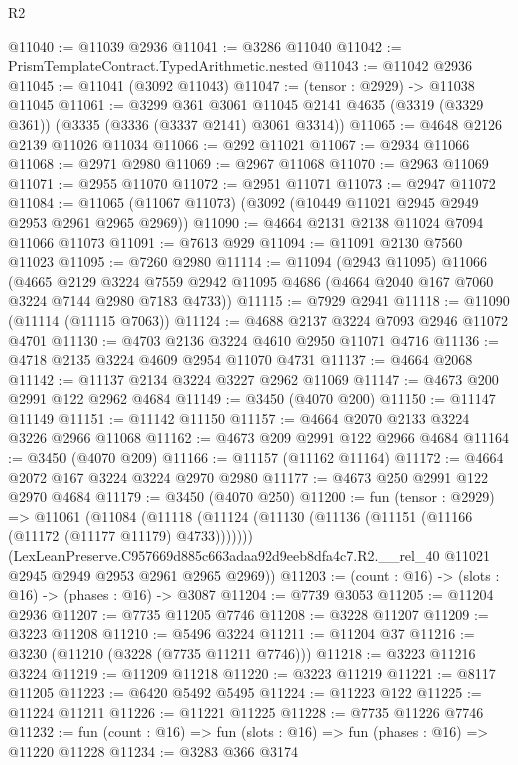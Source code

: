 \begin{lexlean}{R2}
\begin{coremodule}
@11040 := @11039 @2936
@11041 := @3286 @11040
@11042 := PrismTemplateContract.TypedArithmetic.nested
@11043 := @11042 @2936
@11045 := @11041 (@3092 @11043)
@11047 := (tensor : @2929) -> @11038 @11045
@11061 := @3299
    @361
    @3061
    @11045
    @2141
    @4635
    (@3319 (@3329 @361))
    (@3335 (@3336 (@3337 @2141) @3061 @3314))
@11065 := @4648 @2126 @2139 @11026 @11034
@11066 := @292 @11021
@11067 := @2934 @11066
@11068 := @2971 @2980
@11069 := @2967 @11068
@11070 := @2963 @11069
@11071 := @2955 @11070
@11072 := @2951 @11071
@11073 := @2947 @11072
@11084 := @11065 (@11067 @11073) (@3092 (@10449 @11021 @2945 @2949 @2953 @2961 @2965 @2969))
@11090 := @4664 @2131 @2138 @11024 @7094 @11066 @11073
@11091 := @7613 @929
@11094 := @11091 @2130 @7560 @11023
@11095 := @7260 @2980
@11114 := @11094
    (@2943 @11095)
    @11066
    (@4665
      @2129
      @3224
      @7559
      @2942
      @11095
      @4686
      (@4664 @2040 @167 @7060 @3224 @7144 @2980 @7183 @4733))
@11115 := @7929 @2941
@11118 := @11090 (@11114 (@11115 @7063))
@11124 := @4688 @2137 @3224 @7093 @2946 @11072 @4701
@11130 := @4703 @2136 @3224 @4610 @2950 @11071 @4716
@11136 := @4718 @2135 @3224 @4609 @2954 @11070 @4731
@11137 := @4664 @2068
@11142 := @11137 @2134 @3224 @3227 @2962 @11069
@11147 := @4673 @200 @2991 @122 @2962 @4684
@11149 := @3450 (@4070 @200)
@11150 := @11147 @11149
@11151 := @11142 @11150
@11157 := @4664 @2070 @2133 @3224 @3226 @2966 @11068
@11162 := @4673 @209 @2991 @122 @2966 @4684
@11164 := @3450 (@4070 @209)
@11166 := @11157 (@11162 @11164)
@11172 := @4664 @2072 @167 @3224 @3224 @2970 @2980
@11177 := @4673 @250 @2991 @122 @2970 @4684
@11179 := @3450 (@4070 @250)
@11200 := fun (tensor : @2929) =>
  @11061
    (@11084
      (@11118 (@11124 (@11130 (@11136 (@11151 (@11166 (@11172 (@11177 @11179) @4733)))))))
      (LexLeanPreserve.C957669d885c663adaa92d9eeb8dfa4c7.R2.__rel_40
        @11021
        @2945
        @2949
        @2953
        @2961
        @2965
        @2969))
@11203 := (count : @16) -> (slots : @16) -> (phases : @16) -> @3087
@11204 := @7739 @3053
@11205 := @11204 @2936
@11207 := @7735 @11205 @7746
@11208 := @3228 @11207
@11209 := @3223 @11208
@11210 := @5496 @3224
@11211 := @11204 @37
@11216 := @3230 (@11210 (@3228 (@7735 @11211 @7746)))
@11218 := @3223 @11216 @3224
@11219 := @11209 @11218
@11220 := @3223 @11219
@11221 := @8117 @11205
@11223 := @6420 @5492 @5495
@11224 := @11223 @122
@11225 := @11224 @11211
@11226 := @11221 @11225
@11228 := @7735 @11226 @7746
@11232 := fun (count : @16) => fun (slots : @16) => fun (phases : @16) => @11220 @11228
@11234 := @3283 @366 @3174

\end{coremodule}
\end{lexlean}
